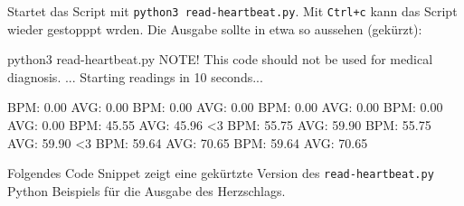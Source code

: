 \documentclass[
  11pt,
  a4paper,
  oneside, openany  ,captions=tableheading
]{scrbook}
\newenvironment{Shaded}{\begin{snugshade}}{\end{snugshade}}
\newcommand{\ExtensionTok}[1]{\textcolor[rgb]{0.00,0.23,0.31}{#1}}
\newcommand{\NormalTok}[1]{\textcolor[rgb]{0.00,0.23,0.31}{#1}}
\newcommand{\OperatorTok}[1]{\textcolor[rgb]{0.37,0.37,0.37}{#1}}
\theoremstyle{remark}
\begin{document}
Startet das Script mit \texttt{python3\ read-heartbeat.py}. Mit
\texttt{Ctrl+c} kann das Script wieder gestopppt wrden. Die Ausgabe
sollte in etwa so aussehen (gekürzt):

\begin{Shaded}
\begin{Highlighting}[]
\ExtensionTok{python3}\NormalTok{ read{-}heartbeat.py }
\ExtensionTok{NOTE!}\NormalTok{ This code should not be used for medical diagnosis. }
\ExtensionTok{...}
\ExtensionTok{Starting}\NormalTok{ readings in 10 seconds...}

   \ExtensionTok{BPM:}\NormalTok{ 0.00  AVG: 0.00}
   \ExtensionTok{BPM:}\NormalTok{ 0.00  AVG: 0.00}
   \ExtensionTok{BPM:}\NormalTok{ 0.00  AVG: 0.00}
   \ExtensionTok{BPM:}\NormalTok{ 0.00  AVG: 0.00}
   \ExtensionTok{BPM:}\NormalTok{ 45.55  AVG: 45.96}
\OperatorTok{\textless{}}\NormalTok{3 }\ExtensionTok{BPM:}\NormalTok{ 55.75  AVG: 59.90}
   \ExtensionTok{BPM:}\NormalTok{ 55.75  AVG: 59.90}
\OperatorTok{\textless{}}\NormalTok{3 }\ExtensionTok{BPM:}\NormalTok{ 59.64  AVG: 70.65}
   \ExtensionTok{BPM:}\NormalTok{ 59.64  AVG: 70.65}
\end{Highlighting}
\end{Shaded}

Folgendes Code Snippet zeigt eine gekürtzte Version des
\texttt{read-heartbeat.py} Python Beispiels für die Ausgabe des
Herzschlags.
\end{document}
